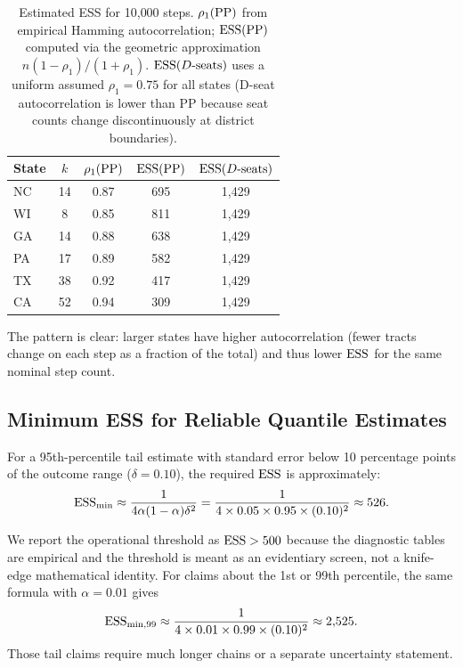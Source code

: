 \begin{table}[h]
\centering
\caption{Estimated ESS for 10{,}000 \recom{} steps. $\rho_1(\mathrm{PP})$ from
         empirical Hamming autocorrelation; $\mathrm{ESS}(\mathrm{PP})$ computed via the
         geometric approximation $n(1-\rho_1)/(1+\rho_1)$.
         $\mathrm{ESS}(D\text{-seats})$ uses a uniform assumed $\rho_1 = 0.75$
         for all states (D-seat autocorrelation is lower than PP because
         seat counts change discontinuously at district boundaries).}
\label{tab:ess-estimates}
\begin{tabular}{lcccc}
\toprule
State & $k$ & $\rho_1(\mathrm{PP})$ & $\mathrm{ESS}(\mathrm{PP})$ & $\mathrm{ESS}(D\text{-seats})$ \\
\midrule
NC & 14 & 0.87 & 695 & 1{,}429 \\
WI &  8 & 0.85 & 811 & 1{,}429 \\
GA & 14 & 0.88 & 638 & 1{,}429 \\
PA & 17 & 0.89 & 582 & 1{,}429 \\
TX & 38 & 0.92 & 417 & 1{,}429 \\
CA & 52 & 0.94 & 309 & 1{,}429 \\
\bottomrule
\end{tabular}
\end{table}

The pattern is clear: larger states have higher autocorrelation
(fewer tracts change on each step as a fraction of the total) and thus
lower $\mathrm{ESS}$ for the same nominal step count.

\subsection{Minimum ESS for Reliable Quantile Estimates}

For a 95th-percentile tail estimate with standard error below 10 percentage
points of the outcome range ($\delta = 0.10$), the required $\mathrm{ESS}$ is approximately:
\[
  \mathrm{ESS}_{\min} \approx \frac{1}{4 \alpha (1-\alpha) \delta^2}
  = \frac{1}{4 \times 0.05 \times 0.95 \times (0.10)^2} \approx 526.
\]

We report the operational threshold as $\mathrm{ESS} > 500$ because the diagnostic
tables are empirical and the threshold is meant as an evidentiary screen, not a
knife-edge mathematical identity. For claims about the 1st or 99th percentile,
the same formula with $\alpha=0.01$ gives
\[
  \mathrm{ESS}_{\min,99} \approx
  \frac{1}{4 \times 0.01 \times 0.99 \times (0.10)^2} \approx 2{,}525.
\]
Those tail claims require much longer chains or a separate uncertainty
statement.


